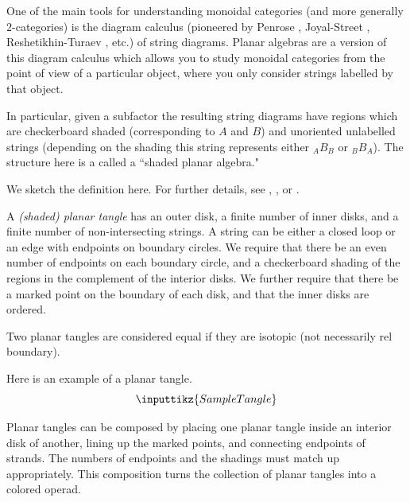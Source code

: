 One of the main tools for understanding monoidal categories (and more generally $2$-categories) is the diagram calculus (pioneered by Penrose \cite{MR0281657}, Joyal-Street \cite{MR1113284}, Reshetikhin-Turaev \cite{MR1036112}, etc.) of string diagrams.  Planar algebras are a version of this diagram calculus which allows you to study monoidal categories from the point of view of a particular object, where you only consider strings labelled by that object.

In particular, given a subfactor the resulting string diagrams have regions which are checkerboard shaded (corresponding to $A$ and $B$) and unoriented unlabelled strings (depending on the shading this string represents either ${}_A B_B$ or ${}_B B_A$).  The structure here is a called a ``shaded planar algebra."

We sketch the definition here.  For further details, see  \cite[\S 2]{MR1865703}, \cite[\S 0]{math.QA/9909027}, or \cite{MR1957084}.

\begin{defn}
A {\em (shaded) planar tangle} 
has an outer disk,
a finite number of inner disks,
and a finite number of non-intersecting strings.
A string can be either a closed loop
or an edge with endpoints on boundary circles.
We require that
there be an even number of endpoints on each boundary circle,
and a checkerboard shading of
the regions in the complement of the interior disks.
We further require that there be a marked point on the boundary of each disk, and that the inner disks are ordered.

Two planar tangles are considered equal if they are isotopic (not necessarily rel boundary).

Here is an example of a planar tangle.
$$\inputtikz{SampleTangle}$$

Planar tangles can be composed by placing one planar tangle inside an interior disk of another,
lining up the marked points,
and connecting endpoints of strands.
The numbers of endpoints and the shadings must match up appropriately.  This composition turns the collection of planar tangles into a colored operad.
\end{defn}

